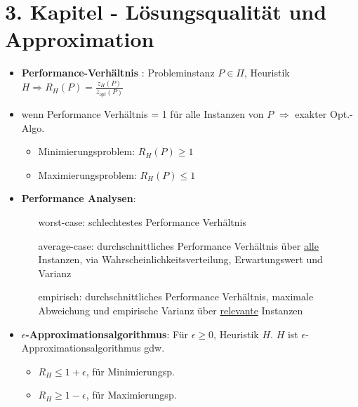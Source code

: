 \documentclass[12pt]{article}
\begin{document}
	\section{3. Kapitel - Lösungsqualität und Approximation}
		\begin{itemize}
			\item\textbf{Performance-Verhältnis} \label{Performance Verhaeltnis}: Probleminstanz $P\in \Pi$, Heuristik \\ 
				$H \Rightarrow R_H(P)=\frac{z_H(P)}{z_{opt}(P)}$ 
			\item wenn Performance Verhältnis = 1 für alle Instanzen von $P$ $\Rightarrow$ exakter Opt.-Algo.
				\begin{itemize}
					\item Minimierungsproblem: $R_H(P) \ge 1$
					\item Maximierungsproblem: $R_H(P) \le 1$
				\end{itemize}
			\item \textbf{Performance Analysen}\label{Performance Analyse}:
				\begin{itemize}
					\item[worst-case:] schlechtestes Performance Verhältnis
					\item[average-case:] durchschnittliches Performance Verhältnis über \underline{alle} Instanzen, via Wahrscheinlichkeitsverteilung, Erwartungswert und Varianz
					\item[empirisch:] durchschnittliches Performance Verhältnis, maximale Abweichung und empirische Varianz über \underline{relevante} Instanzen
				\end{itemize}
			\item \textbf{$\epsilon$-Approximationsalgorithmus}\label{eApproxAlgo}: Für $\epsilon\ge 0$, Heuristik $H$. $H$ ist $\epsilon$-Approximationsalgorithmus gdw.
				\begin{itemize}
					\item $R_H \le 1+ \epsilon$, für Minimierungsp.
					\item $R_H \ge 1- \epsilon$, für Maximierungsp.
				\end{itemize}
		\end{itemize}
\end{document}
